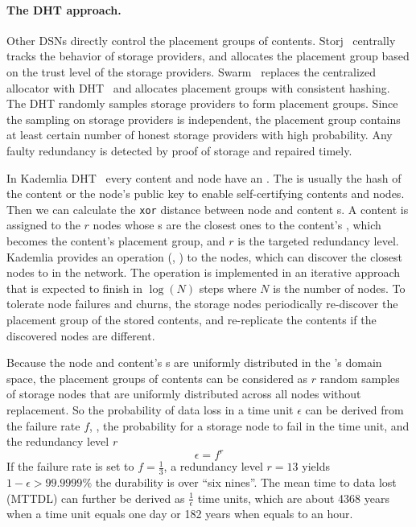 
\paragraph{The DHT approach.}
Other DSNs directly control the placement groups of contents.
Storj~\cite{storj2018storj} centrally tracks the behavior of storage providers, and allocates the placement group based on the trust level of the storage providers.
Swarm~\cite{team2021swarm} replaces the centralized allocator with DHT~\cite{maymounkov2002kademlia} and allocates placement groups with consistent hashing.
The DHT randomly samples storage providers to form placement groups.
Since the sampling on storage providers is independent, the placement group contains at least certain number of honest storage providers with high probability.
Any faulty redundancy is detected by proof of storage and repaired timely.

In Kademlia DHT~\cite{maymounkov2002kademlia} every content and node have an \vid.
The \vid is usually the hash of the content or the node's public key to enable self-certifying contents and nodes.
Then we can calculate the \texttt{xor} distance between node and content \vid{}s.
A content is assigned to the $r$ nodes whose \vid{}s are the closest ones to the content's \vid, which becomes the content's placement group, and $r$ is the targeted redundancy level.
Kademlia provides an operation \ffind(, ) to the nodes, which can discover the  closest nodes to  in the network.
The \ffind operation is implemented in an iterative approach that is expected to finish in $\log(N)$ steps where $N$ is the number of nodes.
To tolerate node failures and churns, the storage nodes periodically re-discover the placement group of the stored contents, and re-replicate the contents if the discovered nodes are different.

Because the node and content's \vid{}s are uniformly distributed in the \vid{}'s domain space, the placement groups of contents can be considered as $r$ random samples of storage nodes that are uniformly distributed across all nodes without replacement.
So the probability of data loss in a time unit $\epsilon$ can be derived from the failure rate $f$, \ie, the probability for a storage node to fail in the time unit, and the redundancy level $r$
\[ \epsilon = f^r \]
If the failure rate is set to $f=\frac{1}{3}$, a redundancy level $r=13$ yields $1-\epsilon>99.9999\%$ \ie the durability is over ``six nines''.
The mean time to data lost (MTTDL) can further be derived as $\frac{1}{\epsilon}$ time units, which are about 4368 years when a time unit equals one day or 182 years when equals to an hour.

